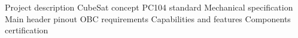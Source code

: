 
\chap Project description
\sec CubeSat concept
\sec PC104 standard
\secc Mechanical specification
\secc Main header pinout
\sec OBC requirements
\secc Capabilities and features 
\secc Components certification